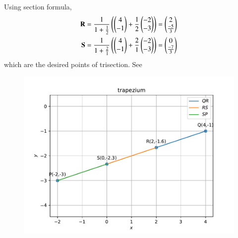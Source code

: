 Using section formula,
\begin{align}
\mathbf{R}=\frac{1}{1+\frac{1}{2}}\left(\begin{pmatrix}4\\-1\end{pmatrix}+\frac{1}{2}\begin{pmatrix}-2\\-3\end{pmatrix}\right)
=\begin{pmatrix}2\\ \frac{-5}{3}\end{pmatrix}\\
\mathbf{S}=\frac{1}{1+\frac{2}{1}}\left(\begin{pmatrix}4\\-1\end{pmatrix}+\frac{2}{1}\begin{pmatrix}-2\\-3\end{pmatrix}\right)
=\begin{pmatrix}0\\ \frac{-7}{3}\end{pmatrix}
\end{align}
which are the desired points of trisection.  See
\begin{figure}[h]
\centering
\includegraphics[width=\columnwidth]{chapters/10/7/2/2/figs/dj.pdf}
\caption{}
		\label{fig:chapters/10/7/2/2/Figure}
\end{figure}
